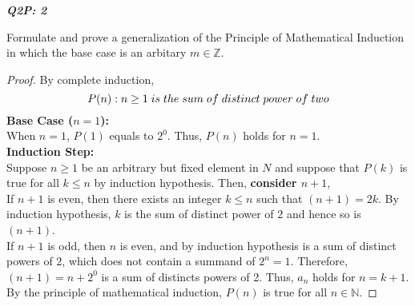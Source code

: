 \documentclass{article}
\begin{document}
\begin{flushleft}
\begin{enumerate}
		\textbf{\textit{Q2P: 2}}
		\begin{flushleft}
			Formulate and prove a generalization of the Principle of Mathematical Induction in which the base case is an arbitary $m \in \mathbb{Z}$.
			\\
			\begin{proof}
				By complete induction, \\
				\[P(n): n \geq 1\thickspace is\thickspace the\thickspace sum\thickspace of\thickspace distinct\thickspace power\thickspace of\thickspace two\]
				\textbf{Base Case ($n = 1$):}
				\\ \vspace{2mm}
				When $n = 1$, $P(1)$ equals to $2^0$. Thus, $P(n)$ holds for $n=1$.
				\\ \vspace{2mm}
				\textbf{Induction Step:}
				\\ \vspace{2mm}
				Suppose $n \geq 1$ be an arbitrary but fixed element in $N$ and suppose that $P(k)$ is true for all $k \leq n$ by induction hypothesis. Then, \textbf{consider $n+1$},\\
				\vspace{2mm}
				If $n+1$ is even, then there exists an integer $k \leq n$ such that $(n+1) = 2k$. By induction hypothesis, $k$ is the sum of distinct power of $2$ and hence so is $(n+1)$.
				\\ \vspace{2mm}
				If $n+1$ is odd, then $n$ is even, and by induction hypothesis is a sum of distinct powers of $2$, which does not contain a summand of $2^n=1$. Therefore, $(n+1) = n + 2^0$ is a sum of distincts powers of 2. 
				Thus, $a_n$ holds for $n=k+1$.
				\\ \vspace{2mm}
				By the principle of mathematical induction, $P(n)$ is true for all $n \in \mathbb{N}$.
			\end{proof}
		\end{flushleft}
		
		\end{enumerate}
	\end{flushleft}
\end{document}
